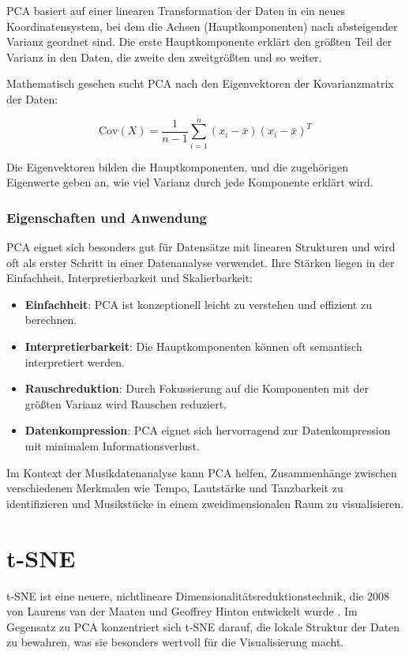 PCA basiert auf einer linearen Transformation der Daten in ein neues Koordinatensystem, bei dem die Achsen (Hauptkomponenten) nach absteigender Varianz geordnet sind. Die erste Hauptkomponente erklärt den größten Teil der Varianz in den Daten, die zweite den zweitgrößten und so weiter.

Mathematisch gesehen sucht PCA nach den Eigenvektoren der Kovarianzmatrix der Daten:

\[
\text{Cov}(X) = \frac{1}{n-1} \sum_{i=1}^{n} (x_i - \bar{x})(x_i - \bar{x})^T
\]

Die Eigenvektoren bilden die Hauptkomponenten, und die zugehörigen Eigenwerte geben an, wie viel Varianz durch jede Komponente erklärt wird.\cite{Pearson1901, pcaTut}

\subsubsection{Eigenschaften und Anwendung}

PCA eignet sich besonders gut für Datensätze mit linearen Strukturen und wird oft als erster Schritt in einer Datenanalyse verwendet. Ihre Stärken liegen in der Einfachheit, Interpretierbarkeit und Skalierbarkeit:

\begin{itemize}
    \item \textbf{Einfachheit}: PCA ist konzeptionell leicht zu verstehen und effizient zu berechnen.
    \item \textbf{Interpretierbarkeit}: Die Hauptkomponenten können oft semantisch interpretiert werden.
    \item \textbf{Rauschreduktion}: Durch Fokussierung auf die Komponenten mit der größten Varianz wird Rauschen reduziert.
    \item \textbf{Datenkompression}: PCA eignet sich hervorragend zur Datenkompression mit minimalem Informationsverlust.
\end{itemize}

Im Kontext der Musikdatenanalyse kann PCA helfen, Zusammenhänge zwischen verschiedenen Merkmalen wie Tempo, Lautstärke und Tanzbarkeit zu identifizieren und Musikstücke in einem zweidimensionalen Raum zu visualisieren.

\section{\acf{t-SNE}}

t-SNE ist eine neuere, nichtlineare Dimensionalitätsreduktionstechnik, die 2008 von Laurens van der Maaten und Geoffrey Hinton entwickelt wurde \cite{vanDerMaaten2008}. Im Gegensatz zu PCA konzentriert sich t-SNE darauf, die lokale Struktur der Daten zu bewahren, was sie besonders wertvoll für die Visualisierung macht.

